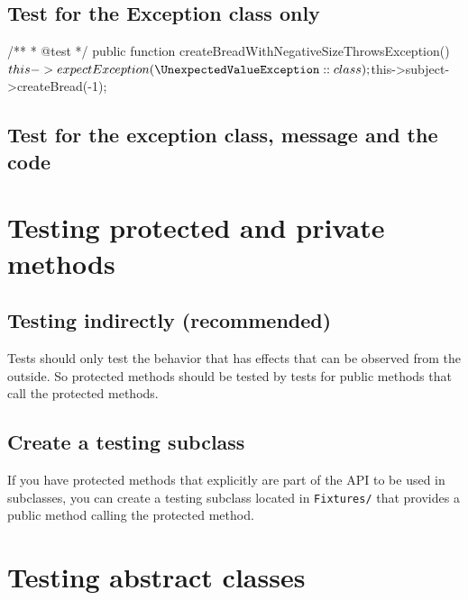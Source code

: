 \documentclass[a4paper,11pt,headsepline]{scrartcl}
\begin{document}
\subsection{Test for the Exception class only}
\begin{phpcode}
/**
 * @test
 */
public function createBreadWithNegativeSizeThrowsException()
{
    $this->expectException(\UnexpectedValueException::class);

    $this->subject->createBread(-1);
}
\end{phpcode}

\subsection{Test for the exception class, message and the code}


\section{Testing protected and private methods}

\subsection{Testing indirectly (recommended)}

Tests should only test the behavior that has effects that can be observed from the outside. So protected methods should be tested by tests for public methods that call the protected methods.

\subsection{Create a testing subclass}

If you have protected methods that explicitly are part of the API to be used in subclasses, you can create a testing subclass located in \texttt{Fixtures/} that provides a public method calling the protected method.


\pagebreak
\section{Testing abstract classes}
\end{document}
